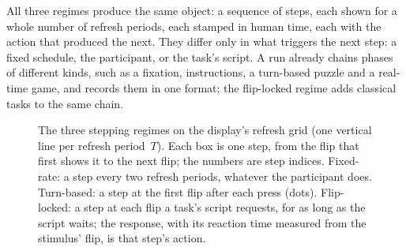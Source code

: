 All three regimes produce the same object: a sequence of steps, each shown for a whole number of refresh periods, each stamped in human time, each with the action that produced the next.
They differ only in what triggers the next step: a fixed schedule, the participant, or the task's script.
A run already chains phases of different kinds, such as a fixation, instructions, a turn-based puzzle and a real-time game, and records them in one format; the flip-locked regime adds classical tasks to the same chain.

\begin{figure}[t]
  \centering
  \caption{The three stepping regimes on the display's refresh grid (one vertical line per refresh period~$T$). Each box is one step, from the flip that first shows it to the next flip; the numbers are step indices. Fixed-rate: a step every two refresh periods, whatever the participant does. Turn-based: a step at the first flip after each press (dots). Flip-locked: a step at each flip a task's script requests, for as long as the script waits; the response, with its reaction time measured from the stimulus' flip, is that step's action.}
  \label{fig:regimes}
\end{figure}

